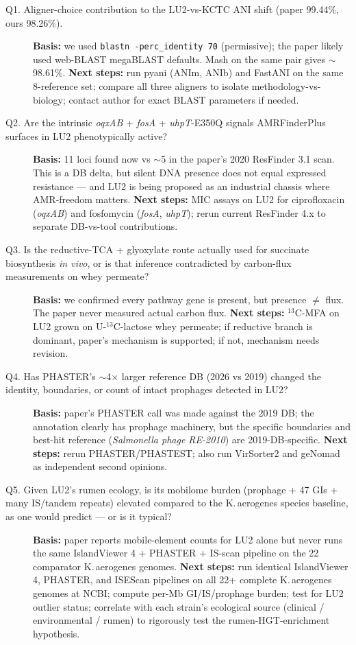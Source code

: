 \begin{description}
  \item[Q1. Aligner-choice contribution to the LU2-vs-KCTC ANI shift (paper 99.44\%, ours 98.26\%).]
  \textbf{Basis:} we used \texttt{blastn -perc\_identity 70} (permissive); the paper likely used web-BLAST megaBLAST defaults. Mash on the same pair gives $\sim$98.61\%. \textbf{Next steps:} run pyani (ANIm, ANIb) and FastANI on the same 8-reference set; compare all three aligners to isolate methodology-vs-biology; contact author for exact BLAST parameters if needed.

  \item[Q2. Are the intrinsic \emph{oqxAB} + \emph{fosA} + \emph{uhpT}-E350Q signals AMRFinderPlus surfaces in LU2 phenotypically active?]
  \textbf{Basis:} 11 loci found now vs $\sim$5 in the paper's 2020 ResFinder 3.1 scan. This is a DB delta, but silent DNA presence does not equal expressed resistance --- and LU2 is being proposed as an industrial chassis where AMR-freedom matters. \textbf{Next steps:} MIC assays on LU2 for ciprofloxacin (\emph{oqxAB}) and fosfomycin (\emph{fosA}, \emph{uhpT}); rerun current ResFinder 4.x to separate DB-vs-tool contributions.

  \item[Q3. Is the reductive-TCA + glyoxylate route actually used for succinate biosynthesis \emph{in vivo}, or is that inference contradicted by carbon-flux measurements on whey permeate?]
  \textbf{Basis:} we confirmed every pathway gene is present, but presence $\neq$ flux. The paper never measured actual carbon flux. \textbf{Next steps:} $^{13}$C-MFA on LU2 grown on U-$^{13}$C-lactose whey permeate; if reductive branch is dominant, paper's mechanism is supported; if not, mechanism needs revision.

  \item[Q4. Has PHASTER's $\sim$4$\times$ larger reference DB (2026 vs 2019) changed the identity, boundaries, or count of intact prophages detected in LU2?]
  \textbf{Basis:} paper's PHASTER call was made against the 2019 DB; the annotation clearly has prophage machinery, but the specific boundaries and best-hit reference (\emph{Salmonella phage RE-2010}) are 2019-DB-specific. \textbf{Next steps:} rerun PHASTER/PHASTEST; also run VirSorter2 and geNomad as independent second opinions.

  \item[Q5. Given LU2's rumen ecology, is its mobilome burden (prophage + 47 GIs + many IS/tandem repeats) elevated compared to the K.\,aerogenes species baseline, as one would predict --- or is it typical?]
  \textbf{Basis:} paper reports mobile-element counts for LU2 alone but never runs the same IslandViewer 4 + PHASTER + IS-scan pipeline on the 22 comparator K.\,aerogenes genomes. \textbf{Next steps:} run identical IslandViewer 4, PHASTER, and ISEScan pipelines on all 22+ complete K.\,aerogenes genomes at NCBI; compute per-Mb GI/IS/prophage burden; test for LU2 outlier status; correlate with each strain's ecological source (clinical / environmental / rumen) to rigorously test the rumen-HGT-enrichment hypothesis.
\end{description}
